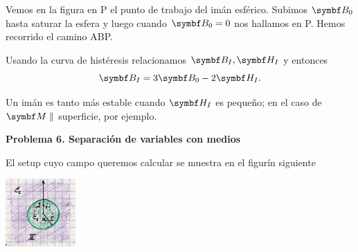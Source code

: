\documentclass[10pt,oneside]{CBFT_book}
\begin{document}
Vemos en la figura en P el punto de trabajo del imán esférico. Subimos $\vb{B}_0$ hasta saturar la
esfera y luego cuando $\vb{B}_0 = 0$ nos hallamos en P. Hemos recorrido el camino ABP.

Usando la curva de histéresis relacionamos $\vb{B}_I, \vb{H}_I$ y entonces
\[
	\vb{B}_I = 3 \vb{B}_0  - 2 \vb{H}_I.
\]

Un imán es tanto más estable cuando $\vb{H}_I$ es pequeño; en el caso de $\vb{M} \parallel$ superficie,
por ejemplo.


\begin{ejemplo}{\bf Problema 6. Separación de variables con medios}
 
El setup cuyo campo queremos calcular se muestra en el figurín siguiente

\includegraphics[width=0.2\textwidth]{images/fig_ft1_problema6_medios.jpg} 


\end{ejemplo}
\end{document}

